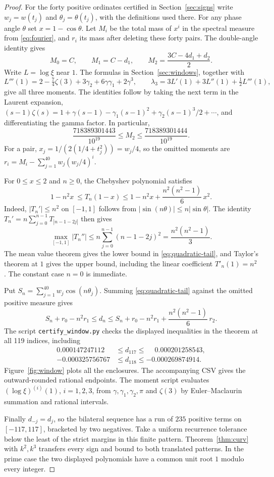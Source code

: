 \begin{proof}
For the forty positive ordinates certified in Section~\ref{sec:signs}
write $w_j=w(t_j)$ and $\theta_j=\theta(t_j)$, with the definitions
used there. For any phase angle $\theta$ set $x=1-\cos\theta$.
Let $M_i$ be the total mass of $x^i$ in the spectral measure from
\eqref{eq:fourier}, and $r_i$ its mass after deleting these forty pairs.
The double-angle identity gives
\[
 M_0=C,\qquad M_1=C-d_1,\qquad
 M_2=\frac{3C-4d_1+d_2}{2}.
\]
Write \(L=\log\xi\) near \(1\). The formulas in Section~\ref{sec:windows}, together with
\[
 L'''(1)=2-\tfrac74\zeta(3)+3\gamma_2+6\gamma\gamma_1+2\gamma^3,\qquad
 \lambda_3=3L'(1)+3L''(1)+\tfrac12 L'''(1),
\]
give all three moments. The identities follow by taking the next term in the Laurent expansion, \((s-1)\zeta(s)=1+\gamma(s-1)-\gamma_1(s-1)^2+\gamma_2(s-1)^3/2+\cdots\), and differentiating the gamma factor. In particular,
\[
 \frac{718389301443}{10^{19}}\le M_2\le
 \frac{718389301444}{10^{19}}.
\]
For a pair, $x_j=1/(2(1/4+t_j^2))=w_j/4$, so the omitted moments are
$r_i=M_i-\sum_{j=1}^{40} w_j(w_j/4)^i$.

For $0\le x\le2$ and $n\ge0$, the Chebyshev polynomial satisfies
\begin{equation}
 1-n^2x\ \le T_n(1-x)\le
 1-n^2x+\frac{n^2(n^2-1)}{6}\,x^2.\label{eq:quadratic-tail}
\end{equation}
Indeed, $|T_n'|\le n^2$ on $[-1,1]$ follows from
$|\sin(n\theta)|\le n|\sin\theta|$. The identity
$T_n'=n\sum_{j=0}^{n-1}T_{|n-1-2j|}$ then gives
\[
 \max_{[-1,1]}|T_n''|\le n\sum_{j=0}^{n-1}(n-1-2j)^2
 =\frac{n^2(n^2-1)}3.
\]
The mean value theorem gives the lower bound in
\eqref{eq:quadratic-tail}, and Taylor's theorem at $1$ gives the upper
bound, including the linear coefficient $T'_n(1)=n^2$. The constant
case $n=0$ is immediate.

Put $S_n=\sum_{j=1}^{40}w_j\cos(n\theta_j)$. Summing
\eqref{eq:quadratic-tail} against the omitted positive measure gives
\[
 S_n+r_0-n^2r_1\le d_n\le
 S_n+r_0-n^2r_1+\frac{n^2(n^2-1)}6\,r_2.
\]
The script \texttt{certify\_window.py} checks the displayed
inequalities in the theorem at all 119 indices, including
\begin{align*}
 0.000147247112&\le d_{117}\le\phantom{-}0.000201258543,\\
 -0.000325756767&\le d_{118}\le-0.000269874914.
\end{align*}
Figure~\ref{fig:window} plots all the enclosures. The accompanying CSV gives the outward-rounded rational endpoints. The moment script evaluates $(\log\xi)^{(i)}(1)$, $i=1,2,3$,
from $\gamma,\gamma_1,\gamma_2,\pi$ and $\zeta(3)$ by
Euler--Maclaurin summation and rational intervals.

Finally $d_{-j}=d_j$, so the bilateral sequence has a run of $235$
positive terms on $[-117,117]$, bracketed by two negatives.
Take a uniform recurrence tolerance below the least of the strict
margins in this finite pattern. Theorem~\ref{thm:curv} with
$k^2,k^3$ transfers every sign and bound to both translated
patterns. In the prime case the two displayed polynomials have a
common unit root $1$ modulo every integer.
\end{proof}

